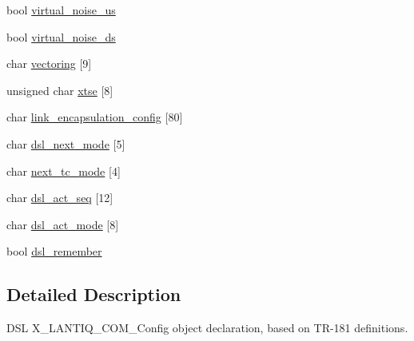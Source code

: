 \begin{DoxyCompactItemize}
\item 
bool \hyperlink{structdsl__fapi__x__lantiq__com__config__obj_aa49239a1b460ec28b61b740f0915b9ae}{virtual\-\_\-noise\-\_\-us}
\item 
bool \hyperlink{structdsl__fapi__x__lantiq__com__config__obj_a4233ed6f0010e7e17785824f885cec21}{virtual\-\_\-noise\-\_\-ds}
\item 
char \hyperlink{structdsl__fapi__x__lantiq__com__config__obj_ad30678405cb97ee59e237cd1862361f8}{vectoring} \mbox{[}9\mbox{]}
\item 
unsigned char \hyperlink{structdsl__fapi__x__lantiq__com__config__obj_ae7d116c23356c0403fbb3b40ff55edbd}{xtse} \mbox{[}8\mbox{]}
\item 
char \hyperlink{structdsl__fapi__x__lantiq__com__config__obj_a37e5159d62457661a69915c637c80c4d}{link\-\_\-encapsulation\-\_\-config} \mbox{[}80\mbox{]}
\item 
char \hyperlink{structdsl__fapi__x__lantiq__com__config__obj_acad157690b955ff9c979e801c4671dac}{dsl\-\_\-next\-\_\-mode} \mbox{[}5\mbox{]}
\item 
char \hyperlink{structdsl__fapi__x__lantiq__com__config__obj_a2f64617e0041e9f1577472b327bd818e}{next\-\_\-tc\-\_\-mode} \mbox{[}4\mbox{]}
\item 
char \hyperlink{structdsl__fapi__x__lantiq__com__config__obj_a1379ebdfd3e4c578081e1f7a033bf64f}{dsl\-\_\-act\-\_\-seq} \mbox{[}12\mbox{]}
\item 
char \hyperlink{structdsl__fapi__x__lantiq__com__config__obj_ac4bb180638691e00261dcdf6d2665270}{dsl\-\_\-act\-\_\-mode} \mbox{[}8\mbox{]}
\item 
bool \hyperlink{structdsl__fapi__x__lantiq__com__config__obj_af6abdd1483004c76b760edeb26586626}{dsl\-\_\-remember}
\end{DoxyCompactItemize}


\subsection{Detailed Description}
D\-S\-L X\-\_\-\-L\-A\-N\-T\-I\-Q\-\_\-\-C\-O\-M\-\_\-\-Config object declaration, based on T\-R-\/181 definitions. 

